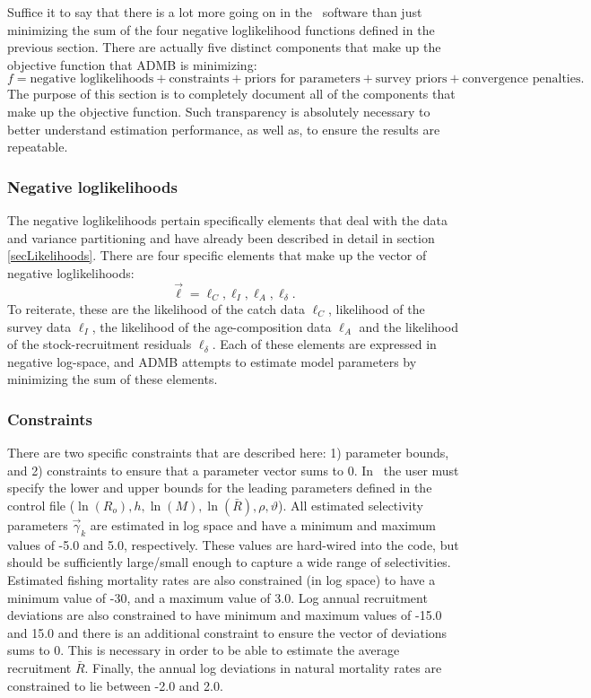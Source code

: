 Suffice it to say that there is a lot more going on in the \iscam\ software than just minimizing the sum of the four negative loglikelihood functions defined in the previous section.  There are actually five distinct components that make up the objective function that ADMB is minimizing:
\[
f = \mbox{negative loglikelihoods}+\mbox{constraints}+\mbox{priors for parameters}+\mbox{survey priors}+\mbox{convergence penalties}.
\]
The purpose of this section is to completely document all of the components that make up the objective function.  Such transparency is absolutely necessary to better understand estimation performance, as well as, to ensure the results are repeatable.

\subsubsection{Negative loglikelihoods}
	The negative loglikelihoods pertain specifically elements that deal with the data and variance partitioning and have already been described in detail in section \ref{secLikelihoods}.  There are four specific elements that make up the vector of negative loglikelihoods:
\begin{equation}\label{eq11}
	\vec{\ell}=\ell_C, \ell_I, \ell_A, \ell_\delta.
\end{equation}
To reiterate, these are the likelihood of the catch data $\ell_C$, likelihood of the survey data $\ell_I$, the likelihood of the age-composition data $\ell_A$ and the likelihood of the stock-recruitment residuals $\ell_\delta$.  Each of these elements are expressed in negative log-space, and ADMB attempts to estimate model parameters by minimizing the sum of these elements.

\subsubsection{Constraints}
There are two specific constraints that are described here: 1) parameter bounds, and 2) constraints to ensure that a parameter vector sums to 0.  In \iscam\ the user must specify the lower and upper bounds for the leading parameters defined in the control file ($\ln(R_o),h,\ln(M),\ln(\bar{R}),\rho,\vartheta$).  All estimated selectivity parameters $\vec{\gamma}_k$ are estimated in log space and have a minimum and maximum values of -5.0 and 5.0, respectively.  These values are hard-wired into the code, but should be sufficiently large/small enough to capture a wide range of selectivities.  Estimated fishing mortality rates are also constrained (in log space) to have a minimum value of -30, and a maximum value of 3.0. Log annual recruitment deviations are also constrained to have minimum and maximum values of -15.0 and 15.0 and there is an additional constraint to ensure the vector of deviations sums to 0. This is necessary in order to be able to estimate the average recruitment $\bar{R}$. Finally, the annual log deviations in natural mortality rates are constrained to lie between -2.0 and 2.0.

